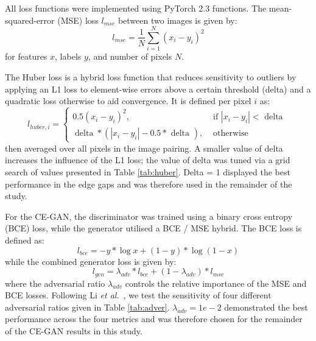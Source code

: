 \documentclass{article}
\begin{document}
All loss functions were implemented using PyTorch 2.3 functions. The mean-squared-error (MSE) loss $l_{mse}$ between two images is given by:
$$
l_{mse} = \frac{1}{N} \sum_{i=1}^{N}\left( x_i - y_i \right)^2$$
for features $x$, labels $y$, and number of pixels $N$. 

The Huber loss is a hybrid loss function that reduces sensitivity to outliers by applying an L1 loss to element-wise errors above a certain threshold (delta) and a quadratic loss otherwise to aid convergence. It is defined per pixel $i$ as:
$$
l_{huber,i}= \begin{cases}0.5\left(x_i-y_i\right)^2, & \text { if }\left|x_i-y_i\right|<\text { delta } \\ \operatorname{delta} *\left(\left|x_i-y_i\right|-0.5 * \text { delta }\right), & \text { otherwise }\end{cases}
$$
then averaged over all pixels in the image pairing. A smaller value of delta increases the influence of the L1 loss; the value of delta was tuned via a grid search of values presented in Table \ref{tab:huber}. Delta = 1 displayed the best performance in the edge gaps and was therefore used in the remainder of the study.

For the CE-GAN, the discriminator was trained using a binary cross entropy (BCE) loss, while the generator utilised a BCE / MSE hybrid. The BCE loss is defined as:
$$
l_{bce}=-y * \log x+\left(1-y\right) * \log \left(1-x\right)
$$
while the combined generator loss is given by:
$$
l_{gen} = \lambda_{adv} * l_{bce} + (1 - \lambda_{adv}) * l_{mse} 
$$
where the adversarial ratio $\lambda_{adv}$ controls the relative importance of the MSE and BCE losses. Following Li \textit{et al.}~\cite{li2023multi}, we test the sensitivity of four different adversarial ratios given in Table \ref{tab:adver}. $\lambda_{adv} = 1e-2$ demonstrated the best performance across the four metrics and was therefore chosen for the remainder of the CE-GAN results in this study.
\end{document}
